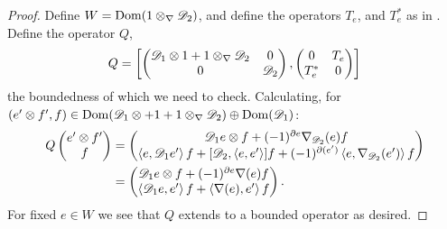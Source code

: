 \begin{proof}
	Define $W=\operatorname{Dom} (1\otimes_{\nabla} \mathscr{D}_2)$, and define the operators $T_e$, and $T_e^*$ as in . Define the operator $Q$,
	\begin{align*}
		Q=\left [ \begin{pmatrix} \mathscr{D}_1\otimes 1+ 1\otimes_\nabla \mathscr{D}_2 & 0 \\ 0 & \mathscr{D}_2 \end{pmatrix}, \begin{pmatrix} 0 & T_e\\ T_e^* & 0\end{pmatrix} \right ]
	\end{align*}
	the boundedness of which we need to check.  
	Calculating, for $(e'\otimes f',f)\in \operatorname{Dom} (\mathscr{D}_1\otimes +1 +1\otimes_\nabla \mathscr{D}_2)\oplus \operatorname{Dom}(\mathscr{D}_1)$:
	\begin{align*}
		Q\begin{pmatrix} e'\otimes f' \\ f \end{pmatrix}&=\begin{pmatrix} \mathscr{D}_1e\otimes f+(-1)^{\partial e} \nabla_{\mathscr{D}_2}(e) f \\  \left \langle e,\mathscr{D}_1 e' \right \rangle f+[\mathscr{D}_2,\left \langle e,e' \right \rangle]f+(-1)^{\partial(e')}\left \langle e,\nabla_{\mathscr{D}_2}(e') \right \rangle f\end{pmatrix} \\
		&=\begin{pmatrix} \mathscr{D}_1e\otimes f +(-1)^{\partial e} \nabla(e)f \\ \left \langle \mathscr{D}_1e,e' \right \rangle f+\left \langle \nabla(e),e' \right \rangle f\end{pmatrix}.
	\end{align*}
	For fixed $e \in W$ we see that $Q$ extends to a bounded operator as desired. 
	

\end{proof}
